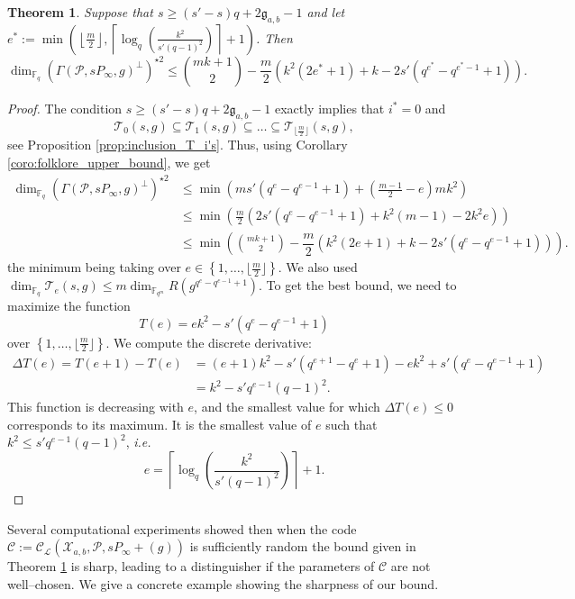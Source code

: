 \documentclass[a4paper]{article}
\newtheorem{thm}{Theorem}[section]
\theoremstyle{definition}
\theoremstyle{remark}
\newcommand{\calP}{\mathcal{P}}
\newcommand{\calL}{\mathcal{L}}
\newcommand{\calC}{\mathcal{C}}
\newcommand{\calT}{\mathcal{T}}
\newcommand{\calX}{\mathcal{X}}
\newcommand{\fqm}{\mathbb{F}_{q^m}}
\newcommand{\fq}{\mathbb{F}_{q}}
\newcommand{\set}[1]{\left\{#1\right\}}
\begin{document}
\begin{thm} \label{thm:bound_with_T_i's_inclusion} 
Suppose that $s \geq (s'-s)q+2\mathfrak{g}_{a,b}-1$ and let $e^* := \min\left(\left\lfloor \frac{m}{2} \right\rfloor, \left\lceil \log_q\left(\frac{k^2}{s'(q-1)^2}\right)\right\rceil+1\right)$. Then
$$\dim_{\fq} (\Gamma(\calP,sP_\infty,g)^{\perp})^{\star 2}\leq \binom{mk+1}{2} - \dfrac{m}{2}(k^2(2e^*+1)+k-2s'(q^{e^*}-q^{e^*-1}+1)). $$
\end{thm}

\begin{proof}
The condition $s \geq (s'-s)q+2\mathfrak{g}_{a,b}-1$ exactly implies that $i^*=0$ and $$\calT_0(s,g) \subseteq \calT_1(s,g) \subseteq \dots \subseteq \calT_{\lfloor \frac{m}{2}\rfloor}(s,g),$$ 
see Proposition \ref{prop:inclusion_T_i's}. Thus, using Corollary \ref{coro:folklore_upper_bound}, we get
\begin{align*}
        \dim_{\fq} (\Gamma(\calP,sP_\infty,g)^{\perp})^{\star 2}
        & \leq \min \left(ms'(q^e-q^{e-1}+1) + \left( \frac{m-1}{2} -e \right)mk^2 \right)\\
        & \leq \min \left(\frac{m}{2}\left(2s'(q^e-q^{e-1}+1)+k^2(m-1)-2k^2e  \right)\right) \\
        & \leq \min\left(\binom{mk+1}{2} - \dfrac{m}{2}\left(k^2(2e+1)+k-2s'(q^e-q^{e-1}+1)\right)\right).
\end{align*}
the minimum being taking over $e \in \set{1,\dots,\lfloor \frac{m}{2} \rfloor}$. We also used $\dim_{\fq}\calT_e(s,g) \leq m \dim_{\fqm} R(g^{q^e-q^{e-1}+1})$.
To get the best bound, we need to maximize the function
$$T(e) = ek^2-s'(q^e-q^{e-1}+1)$$
over $\set{1,\dots,\lfloor \frac{m}{2} \rfloor}$.
We compute the discrete derivative:
\begin{align*}
    \Delta T(e) = T(e+1)-T(e) &= (e+1)k^2- s'(q^{e+1}-q^e+1) - ek^2 + s'(q^e-q^{e-1}+1) \\
                              &= k^2 - s'q^{e-1}(q-1)^2.
\end{align*}
This function is decreasing with $e$, and the smallest value for which $\Delta T(e) \leq 0$ corresponds to its maximum. It is the smallest value of $e$ such that $k^2 \leq s'q^{e-1}(q-1)^2$, \emph{i.e.}
$$e =  \left\lceil \log_q\left(\dfrac{k^2}{s'(q-1)^2}\right)\right\rceil+1.$$
\end{proof}

Several computational experiments showed then when the code $\calC:=\calC_{\calL}(\calX_{a,b},\calP,sP_\infty+(g))$ is sufficiently random the bound given in Theorem \ref{thm:bound_with_T_i's_inclusion} is sharp, leading to a distinguisher if the parameters of $\calC$ are not well--chosen. We give a concrete example showing the sharpness of our bound.
\end{document}
